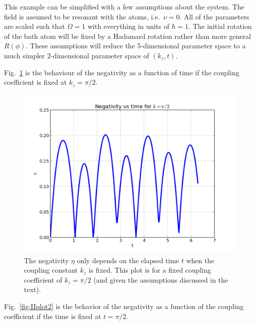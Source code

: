 This example can be simplified with a few assumptions about the system.  The field is assumed to be resonant with the atoms, i.e.\ $\nu=0$. All of the parameters are scaled such that $\Omega=1$ with everything in units of $\hbar=1$.  The initial rotation of the bath atom will be fixed by a Hadamard rotation rather than more general $R(\phi)$.  These assumptions will reduce the 5-dimensional parameter space to a much simpler 2-dimensional parameter space of $(k_z,t)$.
 
Fig.\ \ref{fig:plot1} is the behaviour of the negativity as a function of time if the coupling coefficient is fixed at $k_z=\pi/2$.  
\begin{figure}[th]
\includegraphics[scale=0.75]{figure1.pdf}
\caption{The negativity $\eta$ only depends on the elapsed time $t$ when the coupling constant $k_z$ is fixed.  This plot is for a fixed coupling coefficient of $k_z=\pi/2$ (and given the assumptions discussed in the text).}
 \label{fig:plot1}
\end{figure}
Fig.\ \ref{fig:IIplot2} is the behavior of the negativity as a function of the coupling coefficient if the time is fixed at $t=\pi/2$.  
